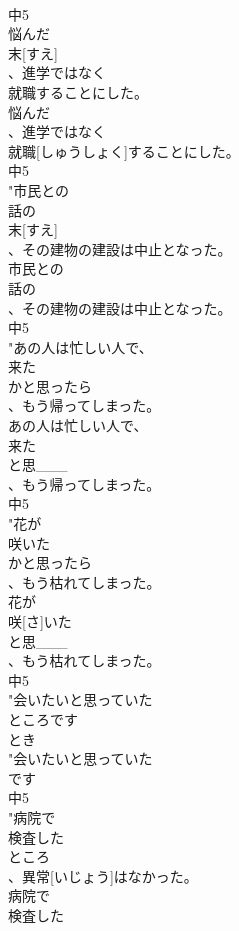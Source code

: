 \documentclass[8pt]{extreport}
\begin{document}
\begin{CJK}{UTF8}{min}
\\	中5
\\	悩んだ
\\	末[すえ]
\\	、進学ではなく
\\	就職することにした。
\\	悩んだ
\\	、進学ではなく
\\	就職[しゅうしょく]することにした。
\\	中5
\\	"市民との
\\	話の
\\	末[すえ]
\\	、その建物の建設は中止となった。
\\	市民との
\\	話の
\\	、その建物の建設は中止となった。
\\	中5
\\	"あの人は忙しい人で、
\\	来た
\\	かと思ったら
\\	、もう帰ってしまった。
\\	あの人は忙しい人で、
\\	来た
\\	と思___
\\	、もう帰ってしまった。
\\	中5
\\	"花が
\\	咲いた
\\	かと思ったら
\\	、もう枯れてしまった。
\\	花が
\\	咲[さ]いた
\\	と思___
\\	、もう枯れてしまった。
\\	中5
\\	"会いたいと思っていた
\\	ところです
\\	とき 
\\	"会いたいと思っていた
\\	です
\\	中5
\\	"病院で
\\	検査した
\\	ところ
\\	、異常[いじょう]はなかった。
\\	病院で
\\	検査した

\end{CJK}
\end{document}
